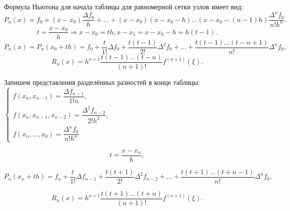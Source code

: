 Формула Ньютона для начала таблицы для равномерной сетки узлов имеет вид:
\begin{equation*}
  P_n(x) = f_0 + (x - x_0) \dfrac{\Delta f_0}{h} + \ldots + (x - x_0)(x - x_0 - h)\ldots(x - x_0 - (n-1)h) \dfrac{\Delta^n f_0}{n! h^n}.
\end{equation*}
\begin{equation*}
  t = \dfrac{x - x_0}{h} \Rightarrow x - x_0 = th, x - x_1 = x - x_0 - h = h(t-1).
\end{equation*}
\begin{equation*}
  P_n(x) = P_n (x_0 + th) = f_0 + \dfrac{t}{1!} \Delta f_0 + \dfrac{t (t-1)}{2!} \Delta^2 f_0 + \ldots + \dfrac{t (t-1) \ldots (t - n + 1)}{n!} \Delta^n f_0.
\end{equation*}
\begin{equation*}
  R_n(x) = h^{n+1} \dfrac{t(t-1)\ldots(t-n)}{(n+1)!} f^{(n+1)} (\xi).
\end{equation*}

Запишем представления разделённых разностей в конце таблицы:
$\begin{cases}
  f(x_n, x_{n-1}) = \dfrac{\Delta f_{n-1}}{1! n}, \\
  f(x_n, x_{n-1}, x_{n-2}) = \dfrac{\Delta^2 f_{n-2}}{2! h^2}, \\
  f(x_n, \ldots, x_0) = \dfrac{\Delta^n f_0}{n! h^n}.
\end{cases}$

\begin{equation*}
  t = \dfrac{x - x_n}{h},
\end{equation*}

\begin{equation*}
  P_n(x_n + th) = f_n + \dfrac{t}{1!} \Delta f_{n-1} + \dfrac{t (t + 1)}{2!} \Delta^2 f_{n-2} + \ldots + \dfrac{t (t + 1) \ldots (t + n - 1)}{n!} \Delta^n f_0,
\end{equation*}

\begin{equation*}
  R_n(x) = h^{n+1} \dfrac{t(t+1)\ldots (t+n)}{(n+1)!} f^{(n+1)} (\xi).
\end{equation*}

